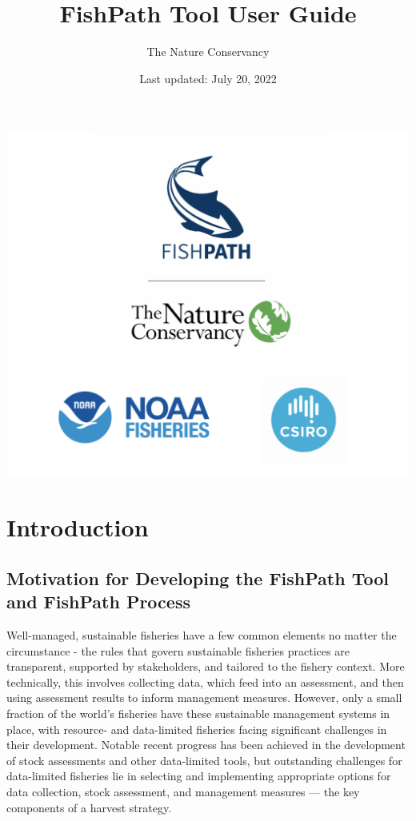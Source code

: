 \documentclass[
  11pt,
]{book}
\title{FishPath Tool User Guide}
\author{The Nature Conservancy}
\date{Last updated: July 20, 2022}
\begin{document}
\maketitle

{
\setcounter{tocdepth}{1}
\tableofcontents
}
\hypertarget{section}{%
\chapter*{}\label{section}}

\begin{center}\includegraphics[width=0.75\linewidth]{images/3-logos} \end{center}

\hypertarget{intro}{%
\chapter{Introduction}\label{intro}}

\hypertarget{motivation}{%
\section{Motivation for Developing the FishPath Tool and FishPath Process}\label{motivation}}

Well-managed, sustainable fisheries have a few common elements no matter the circumstance - the rules that govern sustainable fisheries practices are transparent, supported by stakeholders, and tailored to the fishery context. More technically, this involves collecting data, which feed into an assessment, and then using assessment results to inform management measures. However, only a small fraction of the world's fisheries have these sustainable management systems in place, with resource- and data-limited fisheries facing significant challenges in their development. Notable recent progress has been achieved in the development of stock assessments and other data-limited tools, but outstanding challenges for data-limited fisheries lie in selecting and implementing appropriate options for data collection, stock assessment, and management measures --- the key components of a harvest strategy.
\end{document}
